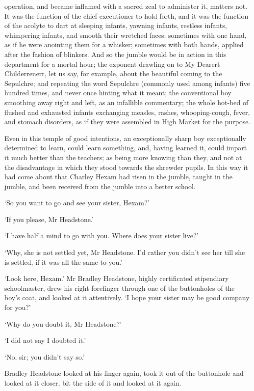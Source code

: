 operation, and became inflamed with a sacred zeal to administer it,
matters not. It was the function of the chief executioner to hold forth,
and it was the function of the acolyte to dart at sleeping infants,
yawning infants, restless infants, whimpering infants, and smooth their
wretched faces; sometimes with one hand, as if he were anointing them
for a whisker; sometimes with both hands, applied after the fashion of
blinkers. And so the jumble would be in action in this department for a
mortal hour; the exponent drawling on to My Dearert Childerrenerr, let
us say, for example, about the beautiful coming to the Sepulchre; and
repeating the word Sepulchre (commonly used among infants) five hundred
times, and never once hinting what it meant; the conventional boy
smoothing away right and left, as an infallible commentary; the whole
hot-bed of flushed and exhausted infants exchanging measles, rashes,
whooping-cough, fever, and stomach disorders, as if they were assembled
in High Market for the purpose.

Even in this temple of good intentions, an exceptionally sharp boy
exceptionally determined to learn, could learn something, and, having
learned it, could impart it much better than the teachers; as being
more knowing than they, and not at the disadvantage in which they stood
towards the shrewder pupils. In this way it had come about that Charley
Hexam had risen in the jumble, taught in the jumble, and been received
from the jumble into a better school.

‘So you want to go and see your sister, Hexam?’

‘If you please, Mr Headstone.’

‘I have half a mind to go with you. Where does your sister live?’

‘Why, she is not settled yet, Mr Headstone. I’d rather you didn’t see
her till she is settled, if it was all the same to you.’

‘Look here, Hexam.’ Mr Bradley Headstone, highly certificated
stipendiary schoolmaster, drew his right forefinger through one of the
buttonholes of the boy’s coat, and looked at it attentively. ‘I hope
your sister may be good company for you?’

‘Why do you doubt it, Mr Headstone?’

‘I did not say I doubted it.’

‘No, sir; you didn’t say so.’

Bradley Headstone looked at his finger again, took it out of the
buttonhole and looked at it closer, bit the side of it and looked at it
again.

